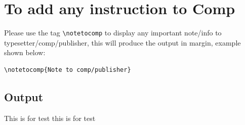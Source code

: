 \documentclass[]{Liebert_Author}
\begin{document}
\nocite*{}



\section{To add any instruction to Comp}

Please use the tag \verb!\notetocomp! to display any important
note/info to typesetter/comp/publisher, this will produce the output
in margin, example shown below:

\begin{verbatim}
\notetocomp{Note to comp/publisher}
\end{verbatim}

\subsection*{Output}

This is for test  this is for test
\end{document}

